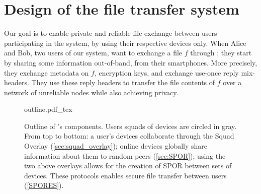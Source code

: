 
\section{Design of the \name file transfer system}%
\label{design}

Our goal is to enable private and reliable file exchange between users 
participating in the system, by using their respective devices only.
When Alice and Bob, two users of our system, want to exchange a file \(f\) 
through \name; they start by sharing some information out-of-band, \eg from 
their smartphones.
More precisely, they exchange metadata on \(f\), encryption keys, and exchange 
use-once reply mix-headers.
They use these reply headers to transfer the file contents of \(f\) over a 
network of unreliable nodes while also achieving privacy.

\begin{figure}[t]
  \centering
  \def\svgwidth{0.8\columnwidth}
  {outline.pdf_tex}
  \caption{\label{fig:outline}%
    Outline of \name's components. Users squads of devices are circled in gray. 
    From top to bottom: a user's devices collaborate through the Squad Overlay 
    (\cref{sec:squad_overlay}); online devices globally share information about 
    them to random peers (\cref{sec:SPOR}); using the two above 
    overlays allows for the creation of \ac{SPOR} between sets of devices. 
    These protocols enables secure file transfer between users 
    (\cref{SPORES}).}
\end{figure}

